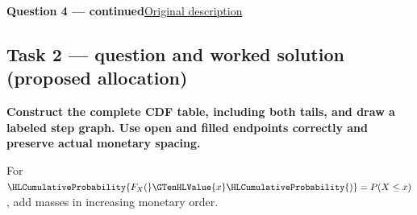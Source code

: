 \par\vspace{3mm}\secInicio[][sec:q4]

\clearpage
\textbf{Question 4 --- continued}\quad\hyperref[sec:q4]{Original description}

\subsection*{Task 2 --- question and worked solution (proposed allocation) }
\label{sol:q4t2}

\noindent\textbf{\boldmath Construct the complete CDF table, including both tails, and draw a labeled step graph. Use open and filled endpoints correctly and preserve actual monetary spacing.}\par\nopagebreak

For $\HLCumulativeProbability{F_X(}\GTenHLValue{x}\HLCumulativeProbability{)}=P(X\leq x)$, add masses in increasing monetary order.

